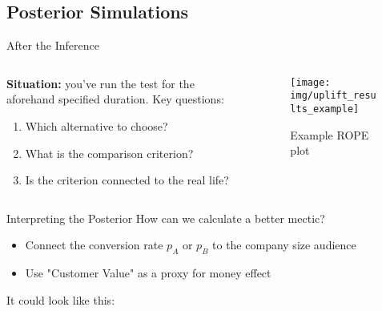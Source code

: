 \documentclass{beamer}
\begin{document}
\subsection{Posterior Simulations}
\begin{frame}{After the Inference}
\begin{columns}
\begin{column}{0.5\linewidth}
\textbf{Situation:} you've run the test for the aforehand specified duration. Key questions:
    \begin{enumerate}
        \item Which alternative to choose?
        \item What is the comparison criterion?
        \item Is the criterion connected to the real life?
    \end{enumerate}
\end{column}
\begin{column}{0.5\linewidth}
\begin{figure}
    \centering
    \texttt{[image: img/uplift\_results\_example]}
    \caption{Example ROPE plot}
\end{figure}
\end{column}
\end{columns}
\end{frame}
\begin{frame}{Interpreting the Posterior}
    How can we calculate a better mectic?
    \begin{itemize}
        \item<2-> Connect the conversion rate $p_A$ or $p_B$ to the company size audience
        \item<3-> Use "Customer Value" as a proxy for money effect
    \end{itemize}
    It could look like this:
\end{frame}
\end{document}
